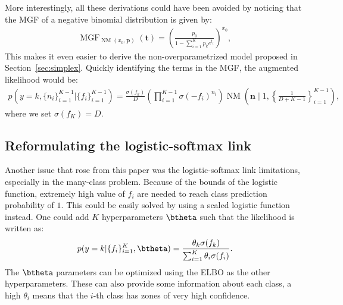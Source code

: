 More interestingly, all these derivations could have been avoided by noticing that the \ac{MGF} of a negative binomial distribution is given by:
\begin{align*}
    \operatorname{MGF}_{\operatorname{NM}(x_0,\boldsymbol{p})}(\boldsymbol{t}) = \left(\frac{p_0}{1-\sum_{i=1}^K p_k e^{t_i}}\right)^{x_0},
\end{align*}
This makes it even easier to derive the non-overparametrized model proposed in Section~\ref{sec:simplex}.
Quickly identifying the terms in the \ac{MGF}, the augmented likelihood would be:
\begin{align*}
    p\left(y=k,\{n_i\}_{i=1}^{K-1}|\{f_i\}_{i=1}^{K-1}\right) = \frac{\sigma(f_k)}{D}\left(\prod_{i=1}^{K-1}\sigma(-f_i)^{n_i}\right)\operatorname{NM}\left(\boldsymbol{n}\mid 1, \left\{\frac{1}{D+K-1}\right\}_{i=1}^{K-1}\right),
\end{align*}
where we set $\sigma(f_K) = D$.

\subsection{Reformulating the logistic-softmax link}

Another issue that rose from this paper was the logistic-softmax link limitations, especially in the many-class problem.
Because of the bounds of the logistic function, extremely high value of $f_i$ are needed to reach class prediction probability of $1$.
This could be easily solved by using a scaled logistic function instead.
One could add $K$ hyperparameters $\btheta$ such that the likelihood is written as:
\begin{align*}
    p(y=k|\{f_i\}_{i=1}^K,\btheta) = \frac{\theta_k \sigma(f_k)}{\sum_{i=1}^K \theta_i \sigma(f_i)}.
\end{align*}
The $\btheta$ parameters can be optimized using the \ac{ELBO} as the other hyperparameters.
These can also provide some information about each class, a high $\theta_i$ means that the $i$-th class has zones of very high confidence.

